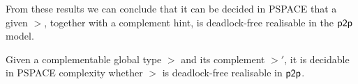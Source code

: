 From these results we can conclude that it can be decided in PSPACE that a given $\gt$,
together with a complement hint, is deadlock-free realisable in the $\mathsf{p2p}$ model.
 \begin{theorem}\label{thm:decidability-of-implementability-in-p2p}
   
   Given a complementable global type $\gt$ and its complement $\gt'$,     it is decidable in PSPACE complexity whether $\gt$ is deadlock-free realisable in $\mathsf{p2p}$.
   
\end{theorem}

